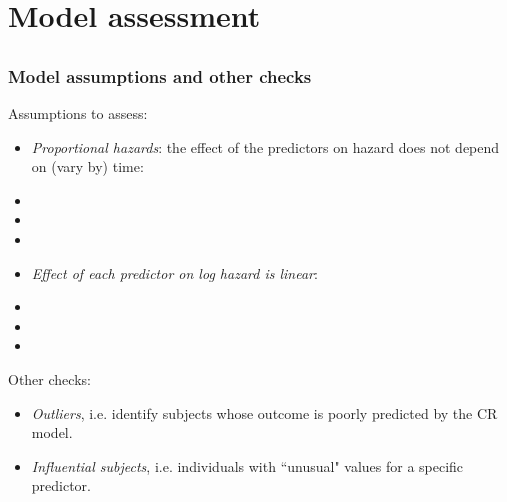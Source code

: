 \section[Model assessment]{Model assessment}
\subsection{}
\begin{frame}
\end{frame}

\begin{frame}
\frametitle{Model assumptions and other checks}
Assumptions to assess:
\begin{itemize}
\item \textit{Proportional hazards}: the effect of the predictors on hazard does not depend on (vary by) time:
\item[]
\item[]
\item[]
\item \textit{Effect of each predictor on log hazard is linear}:
\item[]
\item[]
\item[]
\end{itemize}

Other checks:
\begin{itemize}
\item \textit{Outliers}, i.e. identify subjects whose outcome is poorly predicted by the CR model.
\item \textit{Influential subjects}, i.e. individuals with ``unusual" values for a specific predictor.
\end{itemize}
\end{frame}

